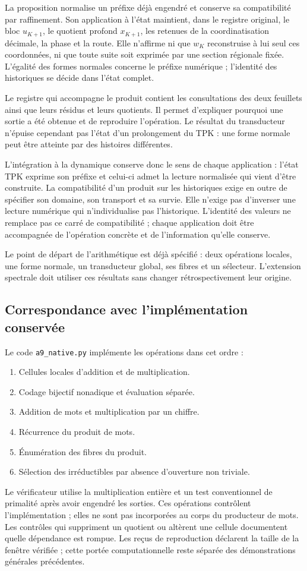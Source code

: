 La proposition normalise un préfixe déjà engendré et conserve sa compatibilité par raffinement. Son application à l'état maintient, dans le registre original, le bloc \(u_{K+1}\), le quotient profond \(x_{K+1}\), les retenues de la coordinatisation décimale, la phase et la route. Elle n'affirme ni que \(w_K\) reconstruise à lui seul ces coordonnées, ni que toute suite soit exprimée par une section régionale fixée. L'égalité des formes normales concerne le préfixe numérique ; l'identité des historiques se décide dans l'état complet.

Le registre qui accompagne le produit contient les consultations des deux feuillets ainsi que leurs résidus et leurs quotients. Il permet d'expliquer pourquoi une sortie a été obtenue et de reproduire l'opération. Le résultat du transducteur n'épuise cependant pas l'état d'un prolongement du TPK : une forme normale peut être atteinte par des histoires différentes.

L'intégration à la dynamique conserve donc le sens de chaque application : l'état TPK exprime son préfixe et celui-ci admet la lecture normalisée qui vient d'être construite. La compatibilité d'un produit sur les historiques exige en outre de spécifier son domaine, son transport et sa survie. Elle n'exige pas d'inverser une lecture numérique qui n'individualise pas l'historique. L'identité des valeurs ne remplace pas ce carré de compatibilité ; chaque application doit être accompagnée de l'opération concrète et de l'information qu'elle conserve.

Le point de départ de l'arithmétique est déjà spécifié : deux opérations locales, une forme normale, un transducteur global, ses fibres et un sélecteur. L'extension spectrale doit utiliser ces résultats sans changer rétrospectivement leur origine.

\subsection{Correspondance avec l'implémentation conservée}
Le code \texttt{a9\_\allowbreak{}native.\allowbreak{}py} implémente les opérations dans cet ordre :

\begin{enumerate}
\item Cellules locales d'addition et de multiplication.
\item Codage bijectif nonadique et évaluation séparée.
\item Addition de mots et multiplication par un chiffre.
\item Récurrence du produit de mots.
\item Énumération des fibres du produit.
\item Sélection des irréductibles par absence d'ouverture non triviale.
\end{enumerate}
Le vérificateur utilise la multiplication entière et un test conventionnel de primalité après avoir engendré les sorties. Ces opérations contrôlent l’implémentation ; elles ne sont pas incorporées au corps du producteur de mots. Les contrôles qui suppriment un quotient ou altèrent une cellule documentent quelle dépendance est rompue. Les reçus de reproduction déclarent la taille de la fenêtre vérifiée ; cette portée computationnelle reste séparée des démonstrations générales précédentes.
